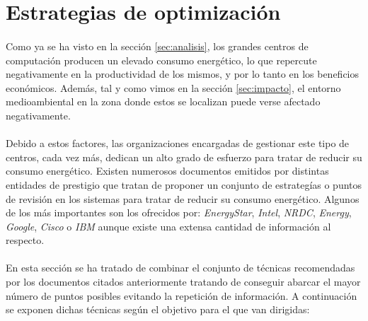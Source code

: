 \documentclass[10pt]{article}
\begin{document}
	  	\paragraph{}



  \section{Estrategias de optimización}
	\label{sec:estrategias}

  	\paragraph{}
		Como ya se ha visto en la sección \ref{sec:analisis}, los grandes centros de computación producen un elevado consumo energético, lo que repercute negativamente en la productividad de los mismos, y por lo tanto en los beneficios económicos. Además, tal y como vimos en la sección \ref{sec:impacto}, el entorno medioambiental en la zona donde estos se localizan puede verse afectado negativamente.


		\paragraph{}
		Debido a estos factores, las organizaciones encargadas de gestionar este tipo de centros, cada vez más, dedican un alto grado de esfuerzo para tratar de reducir su consumo energético. Existen numerosos documentos emitidos por distintas entidades de prestigio que tratan de proponer un conjunto de estrategías o puntos de revisión en los sistemas para tratar de reducir su consumo energético. Algunos de los más importantes son los ofrecidos por: \emph{EnergyStar}\cite{energy-star:guide}, \emph{Intel}\cite{intel:guide}, \emph{NRDC}\cite{nrdc:guide}, \emph{Energy}\cite{energy:guide}, \emph{Google}\cite{google:case_study}, \emph{Cisco}\cite{cisco:guide} o  \emph{IBM}\cite{ibm:guide} aunque existe una extensa cantidad de información al respecto.

		\paragraph{}
		En esta sección se ha tratado de combinar el conjunto de técnicas recomendadas por los documentos citados anteriormente tratando de conseguir abarcar el mayor número de puntos posibles evitando la repetición de información. A continuación se exponen dichas técnicas según el objetivo para el que van dirigidas:
\end{document}
